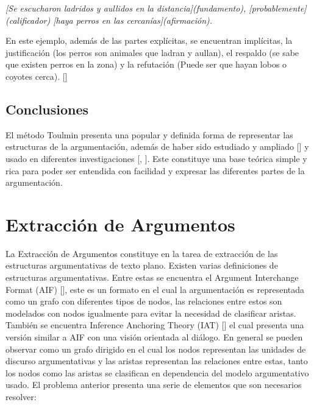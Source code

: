 \emph{[Se escucharon ladridos y aullidos en la distancia](fundamento), [probablemente](calificador) 
[haya perros en las cercanías](afirmación).}

En este ejemplo, además de las partes explícitas, se encuentran implícitas, la justificación 
(los perros son animales que ladran y aullan), el respaldo (se sabe que existen perros en la zona) y 
la refutación (Puede ser que hayan lobos o coyotes cerca). [\cite{toulminArgument}]

\subsection{Conclusiones}

El método Toulmin presenta una popular y definida forma de representar las estructuras de la argumentación, 
además de haber sido estudiado y ampliado [\cite{freeman2011argument}] y usado en diferentes 
investigaciones [\cite{stab2017parsing}, \cite{niculae2017argument}]. Este constituye una base
teórica simple y rica para poder ser entendida con facilidad y expresar las diferentes partes de la 
argumentación. 

\section{Extracción de Argumentos}


La Extracción de Argumentos constituye en la tarea de extracción de las estructuras argumentativas
de texto plano. Existen varias definiciones de estructuras argumentativas. Entre estas se encuentra
el Argument Interchange Format (AIF) [\cite{rahwan2009aif}], este es un formato en el cual la argumentación
es representada como un grafo con diferentes tipos de nodos, las relaciones entre estos son modelados con 
nodos igualmente para evitar la necesidad de clasificar aristas. También se encuentra Inference Anchoring Theory 
(IAT) [\cite{corneli2019iat}] el cual presenta una versión similar a AIF con una visión orientada al diálogo.
En general se pueden observar como un grafo dirigido en el cual los nodos representan las unidades de
discurso argumentativas y las aristas representan las relaciones entre estas, tanto los nodos como
las aristas se clasifican en dependencia del modelo argumentativo usado.
El problema anterior presenta una serie de elementos que son necesarios resolver:

